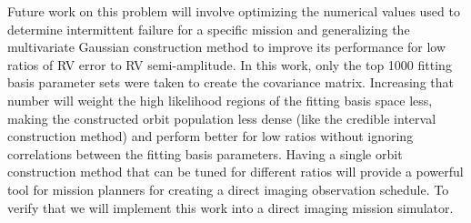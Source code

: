 Future work on this problem will involve optimizing the numerical values used to determine
intermittent failure for a specific mission and generalizing the multivariate Gaussian construction
method to improve its performance for low ratios of RV error to RV semi-amplitude. In this work, only
the top 1000 fitting basis parameter sets were taken to create the covariance matrix.  Increasing
that number will weight the high likelihood regions of the fitting basis space less, making the
constructed orbit population less dense (like the credible interval construction method) and perform
better for low ratios without ignoring correlations between the fitting basis parameters.  Having a
single orbit construction method that can be tuned for different ratios will provide a powerful tool
for mission planners for creating a direct imaging observation schedule. To verify that we will
implement this work into a direct imaging mission simulator.


